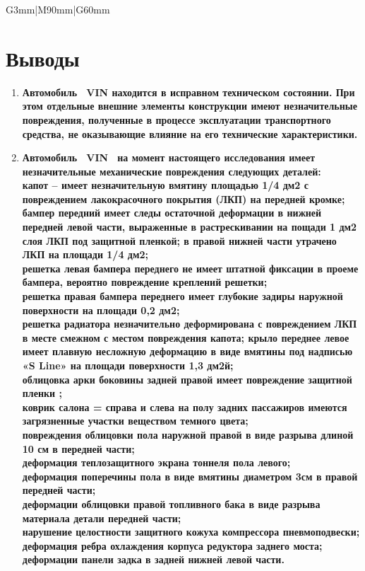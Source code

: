 \begin{longtable}{G{3mm}|M{90mm}|G{60mm}}
\section{Выводы}

\begin{enumerate}
	\item \textbf{Автомобиль  \, VIN \vin находится в исправном техническом состоянии. При этом отдельные внешние элементы конструкции имеют незначительные повреждения, полученные в процессе эксплуатации транспортного средства,  не оказывающие влияние на его технические характеристики.}\\[3mm]
	\item \textbf{Автомобиль  \, VIN \vin \, на момент настоящего исследования имеет незначительные механические  повреждения  следующих деталей:\\
	капот – имеет незначительную вмятину площадью 1/4 дм2  с повреждением лакокрасочного покрытия (ЛКП) на передней кромке;\\
	бампер передний имеет следы остаточной деформации  в нижней передней левой части, выраженные в   растрескивании на пощади 1 дм2 слоя ЛКП под защитной пленкой; в правой нижней части  утрачено ЛКП на площади 1/4 дм2;\\ 
	решетка левая бампера переднего  не имеет  штатной фиксации  в проеме бампера, вероятно  повреждение креплений решетки;\\    
	решетка правая бампера переднего  имеет глубокие  задиры наружной поверхности  на площади 0,2 дм2;\\  
	решетка радиатора незначительно деформирована с повреждением ЛКП в месте смежном с местом повреждения капота;  
	крыло переднее левое имеет плавную несложную деформацию в виде вмятины  под надписью «S Line» на площади поверхности 1,3 дм2й;\\
	облицовка арки боковины задней правой имеет повреждение защитной пленки ;\\   
	коврик салона = справа и слева  на полу задних пассажиров имеются загрязненные участки веществом темного цвета; \\  
	повреждения облицовки пола наружной правой в виде разрыва длиной 10 см в передней части;\\  
	деформация теплозащитного экрана тоннеля пола левого;\\ 
	деформация  поперечины пола в виде вмятины диаметром 3см в правой передней части;\\  
	деформации облицовки  правой  топливного бака в виде разрыва материала детали передней части;\\   
	нарушение целостности защитного кожуха компрессора пневмоподвески;\\  
	деформация ребра охлаждения корпуса редуктора заднего моста;\\  
	деформации панели задка в задней нижней  левой части.   }\\[3mm]


\end{enumerate}
\end{longtable}
